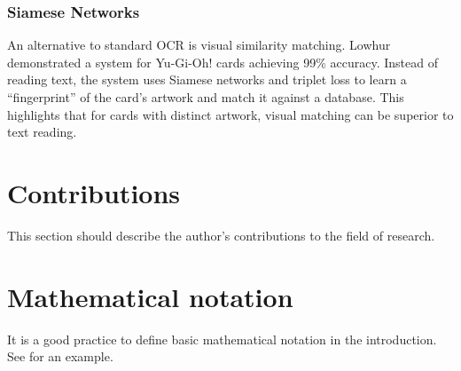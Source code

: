 \subsubsection{Siamese Networks}
An alternative to standard \ac{OCR} is visual similarity matching. Lowhur \cite{lowhuryugioh} demonstrated a system for 
Yu-Gi-Oh! cards achieving 99\% accuracy. Instead of reading text, the system uses Siamese networks and triplet loss to 
learn a \enquote{fingerprint} of the card's artwork and match it against a database. This highlights that for cards with 
distinct artwork, visual matching can be superior to text reading.


\section{Contributions}

This section should describe the author's contributions to the field of research.

\section{Mathematical notation}

It is a good practice to define basic mathematical notation in the introduction.
See  for an example.

